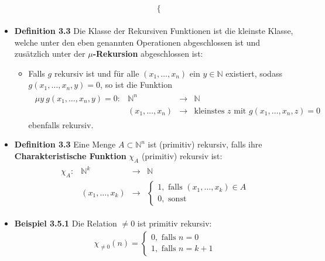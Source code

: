 \documentclass{scrartcl}
\begin{document}
\begin{itemize}
\begin{itemize}
\begin{align*}
\begin{array}{cccc}
\begin{cases}
             \end{cases}
        \end{array}
        \end{align*}
    \end{itemize}
    \item{\textbf{Definition 3.3}} Die Klasse der Rekursiven Funktionen ist die kleinste Klasse, welche unter den eben genannten Operationen abgeschlossen ist und zusätzlich unter der \textbf{$\mu$-Rekursion} abgeschlossen ist:
    \begin{itemize}
        \item Falls $g$ rekursiv ist und für alle $(x_1, \hdots, x_n)$ ein $y \in \mathbb{N}$ existiert, sodass $g(x_1, \hdots, x_n, y) = 0$, so ist die Funktion
        \begin{align*}
        \begin{array}{cccc}
            \mu y\ g(x_1, \hdots, x_n, y) = 0: &\mathbb{N}^n &\to& \mathbb{N}\\
            &(x_1, \hdots, x_n) &\to& \text{kleinstes $z$ mit $g(x_1, \hdots, x_n, z) = 0$}
        \end{array}
        \end{align*}
        ebenfalls rekursiv.
    \end{itemize}
    \item{\textbf{Definition 3.3}} Eine Menge $A \subset \mathbb{N}^n$ ist (primitiv) rekursiv, falls ihre \textbf{Charakteristische Funktion} $\chi_A$ (primitiv) rekursiv ist:
    \begin{align*}
        \begin{array}{cccc}
             \chi_A: & \mathbb{N}^k & \to & \mathbb{N}  \\
             & (x_1, \hdots, x_k) & \to & 
             \begin{cases}
             1, \text{ falls } (x_1, \hdots, x_k) \in A\\
             0, \text{ sonst}
             \end{cases}
        \end{array}
    \end{align*}
    \item{\textbf{Beispiel 3.5.1}} Die Relation $\neq 0$ ist primitiv rekursiv:
    \begin{align*}
        \chi_{\neq 0}(n) = 
        \begin{cases}
             0, \text{ falls } n = 0\\
             1, \text{ falls } n = k + 1
        \end{cases}

\end{align*}
\end{itemize}
\end{document}
